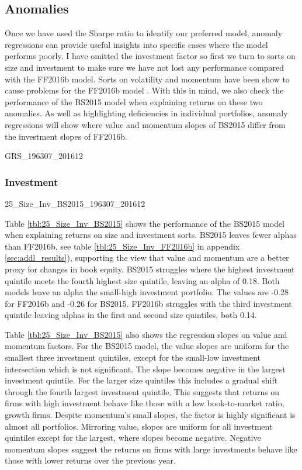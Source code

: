 
\subsection{Anomalies}

Once we have used the Sharpe ratio to identify our preferred model, anomaly regressions
can provide useful insights into specific cases where the model performs poorly. I have
omitted the investment factor so first we turn to sorts on size and investment to make
sure we have not lost any performance compared with the FF2016b model. Sorts on volatility
\parencite{ang2006cross} and momentum \parencite{jegadeesh1993returns} have been show to
cause problems for the FF2016b model \parencite{fama2016dissecting}. With this in mind, we
also check the performance of the BS2015 model when explaining returns on these two
anomalies. As well as highlighting deficiencies in individual portfolios, anomaly
regressions will show where value and momentum slopes of BS2015 differ from the investment
slopes of FF2016b.

{GRS_196307_201612}

\subsubsection{Investment}

{25_Size_Inv_BS2015_196307_201612}

Table \ref{tbl:25_Size_Inv_BS2015} shows the performance of the BS2015
model when  explaining returns on size and investment sorts. BS2015 leaves fewer alphas
than FF2016b, see table \ref{tbl:25_Size_Inv_FF2016b} in appendix \ref{sec:addl_results}),
supporting the view that value and momentum are a better proxy for changes in book equity.
BS2015 struggles where the highest investment quintile meets the fourth highest size
quintile, leaving an alpha of 0.18. Both models leave an alpha the small-high investment
portfolio. The values are -0.28 for FF2016b and -0.26 for BS2015. FF2016b struggles with
the third investment quintile leaving alphas in the first and second  size quintiles, both
0.14.

Table \ref{tbl:25_Size_Inv_BS2015} also shows the regression slopes on value and momentum
factors. For the BS2015 model, the value slopes are uniform for the smallest three
investment  quintiles, except for the small-low investment intersection which is not
significant. The slope becomes negative in the largest investment quintile. For the larger
size quintiles this includes a gradual shift through the fourth largest investment
quintile. This suggests that returns on firms with high investment behave like those with
a low  book-to-market ratio, growth firms. Despite momentum's small slopes, the factor is
highly significant is almost all portfolios. Mirroring value, slopes are uniform for all
investment quintiles except for the largest, where  slopes become negative. Negative
momentum slopes suggest the returns on firms with large investments behave like those with
lower returns over the previous year.

